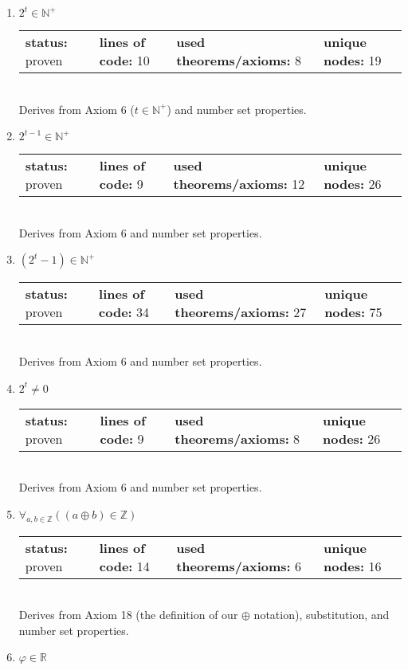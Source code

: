 \documentclass{article}[12pt]
\begin{document}
\begin{enumerate}
\item $2^{t} \in \mathbb{N}^+$ \hfill \\
  \begin{tabular}{l | l | l | l}
    \textbf{status:} proven & \textbf{lines of code:} 10 & \textbf{used theorems/axioms:} 8 & \textbf{unique nodes:} 19
  \end{tabular} \hfill \\
  Derives from Axiom 6 ($t \in \mathbb{N}^+$) and number set properties.
\item $2^{t - 1} \in \mathbb{N}^+$ \hfill \\
  \begin{tabular}{l | l | l | l}
    \textbf{status:} proven & \textbf{lines of code:} 9 & \textbf{used theorems/axioms:} 12 & \textbf{unique nodes:} 26
  \end{tabular} \hfill \\
  Derives from Axiom 6 and number set properties.
\item $\left(2^{t} - 1\right) \in \mathbb{N}^+$ \hfill \\
  \begin{tabular}{l | l | l | l}
    \textbf{status:} proven & \textbf{lines of code:} 34 & \textbf{used theorems/axioms:} 27 & \textbf{unique nodes:} 75
  \end{tabular} \hfill \\
  Derives from Axiom 6 and number set properties.
\item $2^{t} \neq 0$ \hfill \\
  \begin{tabular}{l | l | l | l}
    \textbf{status:} proven & \textbf{lines of code:} 9 & \textbf{used theorems/axioms:} 8 & \textbf{unique nodes:} 26
  \end{tabular} \hfill \\
  Derives from Axiom 6 and number set properties.
\item $\forall_{a, b \in \mathbb{Z}} \left(\left(a \oplus b\right) \in \mathbb{Z}\right)$ \hfill \\
  \begin{tabular}{l | l | l | l}
    \textbf{status:} proven & \textbf{lines of code:} 14 & \textbf{used theorems/axioms:} 6 & \textbf{unique nodes:} 16
  \end{tabular} \hfill \\
  Derives from Axiom 18 (the definition of our $\oplus$ notation), substitution, and number set properties.
\item $\varphi \in \mathbb{R}$ \hfill \\

\end{enumerate}
\end{document}
